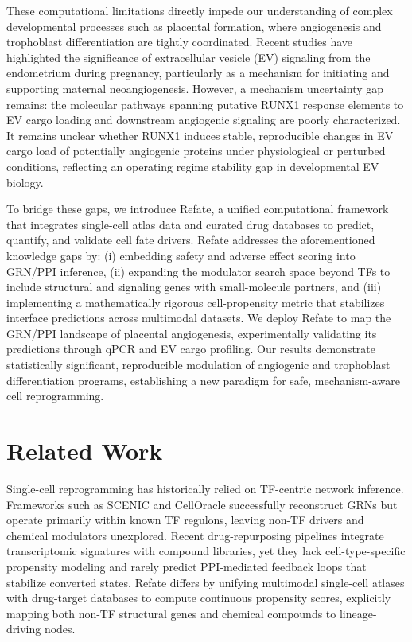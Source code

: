 \documentclass[11pt,a4paper]{article}
\begin{document}
These computational limitations directly impede our understanding of complex developmental processes such as placental formation, where angiogenesis and trophoblast differentiation are tightly coordinated. Recent studies have highlighted the significance of extracellular vesicle (EV) signaling from the endometrium during pregnancy, particularly as a mechanism for initiating and supporting maternal neoangiogenesis. However, a mechanism uncertainty gap remains: the molecular pathways spanning putative RUNX1 response elements to EV cargo loading and downstream angiogenic signaling are poorly characterized. It remains unclear whether RUNX1 induces stable, reproducible changes in EV cargo load of potentially angiogenic proteins under physiological or perturbed conditions, reflecting an operating regime stability gap in developmental EV biology.

To bridge these gaps, we introduce Refate, a unified computational framework that integrates single-cell atlas data and curated drug databases to predict, quantify, and validate cell fate drivers. Refate addresses the aforementioned knowledge gaps by: (i) embedding safety and adverse effect scoring into GRN/PPI inference, (ii) expanding the modulator search space beyond TFs to include structural and signaling genes with small-molecule partners, and (iii) implementing a mathematically rigorous cell-propensity metric that stabilizes interface predictions across multimodal datasets. We deploy Refate to map the GRN/PPI landscape of placental angiogenesis, experimentally validating its predictions through qPCR and EV cargo profiling. Our results demonstrate statistically significant, reproducible modulation of angiogenic and trophoblast differentiation programs, establishing a new paradigm for safe, mechanism-aware cell reprogramming.

\section{Related Work}
Single-cell reprogramming has historically relied on TF-centric network inference. Frameworks such as SCENIC and CellOracle successfully reconstruct GRNs but operate primarily within known TF regulons, leaving non-TF drivers and chemical modulators unexplored. Recent drug-repurposing pipelines integrate transcriptomic signatures with compound libraries, yet they lack cell-type-specific propensity modeling and rarely predict PPI-mediated feedback loops that stabilize converted states. Refate differs by unifying multimodal single-cell atlases with drug-target databases to compute continuous propensity scores, explicitly mapping both non-TF structural genes and chemical compounds to lineage-driving nodes.
\end{document}
